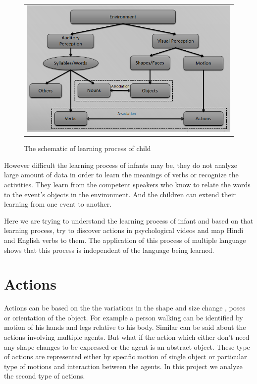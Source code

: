 \def\DevnagVersion{2.15}\documentclass[a4paper, 11pt, notitlepage]{report}
\begin{document}
\begin{figure}[h]
\center
\begin{tabular}{c}
\includegraphics[scale=0.5]{childLearn1.png}
\end{tabular}
\label{tab:gt}
\caption{The schematic of learning process of child}
\end{figure}


However difficult the learning process of infants may be, they do not analyze large amount of data in order to learn the meanings of verbs or recognize the activities. They learn from the competent speakers who know to relate the words to the event's objects in the environment.\cite{kerr-cohen-08_wubble-world-lang-acquisition} And the children can extend their learning from one event to another. 

Here we are trying to understand the learning process of infant and based on that learning process, try to discover actions in psychological videos and map Hindi and English verbs to them. The application of this process of multiple language shows that this process is independent of the language being learned.



\section{Actions} 
\hspace*{10pt} Actions can be based on the the variations in the shape and size change , poses\cite{pami-Ben-ArieWPR02}  or orientation of the object. For example a person walking can be identified by motion of his hands and legs relative to his body\cite{JacksonBP05}. Similar can be said about the actions involving multiple agents. But what if the action which either don't need any shape changes to be expressed or the agent is an abstract object. These type of actions are represented either by specific motion of single object or particular type of motions and interaction between the agents. In this project we analyze the second type of actions.\\
\end{document}
